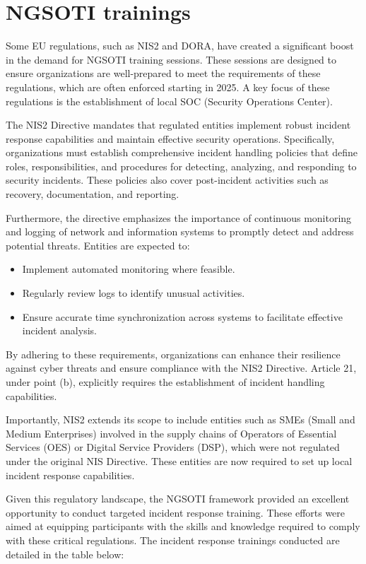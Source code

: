 \chapter{NGSOTI trainings}
Some EU regulations, such as NIS2 and DORA, have created a significant boost in the demand for NGSOTI training sessions. These sessions are designed to ensure organizations are well-prepared to meet the requirements of these regulations, which are often enforced starting in 2025. A key focus of these regulations is the establishment of local SOC (Security Operations Center).

The NIS2 Directive mandates that regulated entities implement robust incident response capabilities and maintain effective security operations. Specifically, organizations must establish comprehensive incident handling policies that define roles, responsibilities, and procedures for detecting, analyzing, and responding to security incidents. These policies also cover post-incident activities such as recovery, documentation, and reporting.

Furthermore, the directive emphasizes the importance of continuous monitoring and logging of network and information systems to promptly detect and address potential threats. Entities are expected to:

\begin{itemize}
	\item Implement automated monitoring where feasible.
	\item Regularly review logs to identify unusual activities.
	\item Ensure accurate time synchronization across systems to facilitate effective incident analysis.
\end{itemize}

By adhering to these requirements, organizations can enhance their resilience against cyber threats and ensure compliance with the NIS2 Directive. Article 21, under point (b), explicitly requires the establishment of incident handling capabilities.

Importantly, NIS2 extends its scope to include entities such as SMEs (Small and Medium Enterprises) involved in the supply chains of Operators of Essential Services (OES) or Digital Service Providers (DSP), which were not regulated under the original NIS Directive. These entities are now required to set up local incident response capabilities.

Given this regulatory landscape, the NGSOTI framework provided an excellent opportunity to conduct targeted incident response training. These efforts were aimed at equipping participants with the skills and knowledge required to comply with these critical regulations. The incident response trainings conducted are detailed in the table below:


